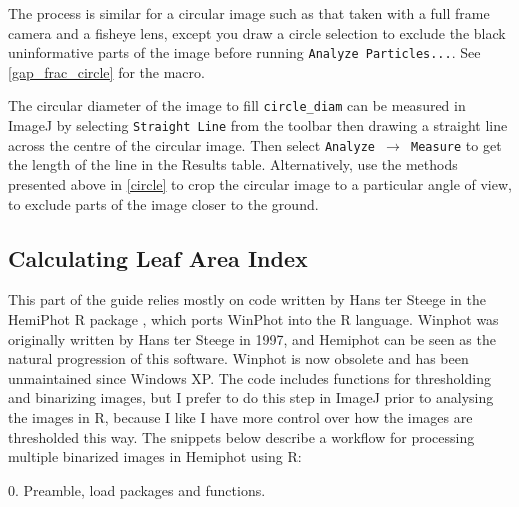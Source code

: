 \documentclass{article}
\newcommand\menu[1]{\texttt{\color{blue}#1}}
\newcommand\file[1]{\texttt{\underline{#1}}}
\begin{document}
\begin{minipage}{\linewidth}

\end{minipage}

The process is similar for a circular image such as that taken with a full frame camera and a fisheye lens, except you draw a circle selection to exclude the black uninformative parts of the image before running \menu{Analyze Particles...}. See \autoref{gap_frac_circle} for the macro. 

\begin{minipage}{\linewidth}

\end{minipage}

The circular diameter of the image to fill \verb|circle_diam| can be measured in ImageJ by selecting \menu{Straight Line} from the toolbar then drawing a straight line across the centre of the circular image. Then select \menu{Analyze $\rightarrow$ Measure} to get the length of the line in the Results table. Alternatively, use the methods presented above in \autoref{circle} to crop the circular image to a particular angle of view, to exclude parts of the image closer to the ground.

\subsection{Calculating Leaf Area Index}

This part of the guide relies mostly on code written by Hans ter Steege in the HemiPhot R package \citep{Steege2018}, which ports WinPhot into the R language. Winphot was originally written by Hans ter Steege in 1997, and Hemiphot can be seen as the natural progression of this software. Winphot is now obsolete and has been unmaintained since Windows XP. The code includes functions for thresholding and binarizing images, but I prefer to do this step in ImageJ prior to analysing the images in R, because I like I have more control over how the images are thresholded this way. The snippets below describe a workflow for processing multiple binarized images in Hemiphot using R:

\vspace{0.5cm}
\begin{minipage}{\linewidth}
0. Preamble, load packages and functions.

\end{minipage}
\end{document}
